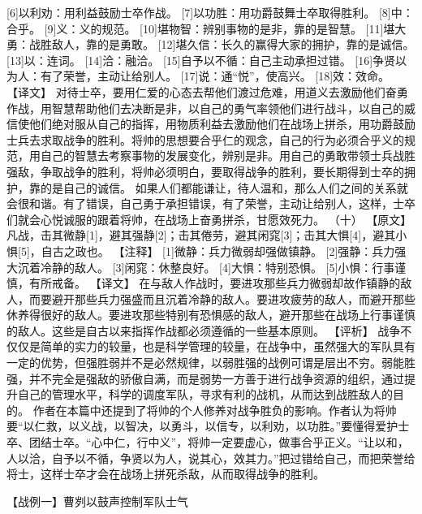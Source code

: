 \documentclass[a4paper,12pt,UTF8,twoside]{ctexbook}
\begin{document}
[6]以利劝：用利益鼓励士卒作战。
[7]以功胜：用功爵鼓舞士卒取得胜利。
[8]中：合乎。
[9]义：义的规范。
[10]堪物智：辨别事物的是非，靠的是智慧。
[11]堪大勇：战胜敌人，靠的是勇敢。
[12]堪久信：长久的赢得大家的拥护，靠的是诚信。
[13]以：连词。
[14]洽：融洽。
[15]自予以不循：自己主动承担过错。
[16]争贤以为人：有了荣誉，主动让给别人。
[17]说：通“悦”，使高兴。
[18]效：效命。
【译文】
对待士卒，要用仁爱的心态去帮他们渡过危难，用道义去激励他们奋勇作战，用智慧帮助他们去决断是非，以自己的勇气率领他们进行战斗，以自己的威信使他们绝对服从自己的指挥，用物质利益去激励他们在战场上拼杀，用功爵鼓励士兵去求取战争的胜利。将帅的思想要合乎仁的观念，自己的行为必须合乎义的规范，用自己的智慧去考察事物的发展变化，辨别是非。用自己的勇敢带领士兵战胜强敌，争取战争的胜利，将帅必须明白，要取得战争的胜利，要长期得到士卒的拥护，靠的是自己的诚信。
如果人们都能谦让，待人温和，那么人们之间的关系就会很和谐。有了错误，自己勇于承担错误，有了荣誉，主动让给别人，这样，士卒们就会心悦诚服的跟着将帅，在战场上奋勇拼杀，甘愿效死力。
（十）
【原文】
凡战，击其微静[1]，避其强静[2]；击其倦劳，避其闲窕[3]；击其大惧[4]，避其小惧[5]，自古之政也。
【注释】
[1]微静：兵力微弱却强做镇静。
[2]强静：兵力强大沉着冷静的敌人。
[3]闲窕：休整良好。
[4]大惧：特别恐惧。
[5]小惧：行事谨慎，有所戒备。
【译文】
在与敌人作战时，要进攻那些兵力微弱却故作镇静的敌人，而要避开那些兵力强盛而且沉着冷静的敌人。要进攻疲劳的敌人，而避开那些休养得很好的敌人。要进攻那些特别有恐惧感的敌人，避开那些在战场上行事谨慎的敌人。这些是自古以来指挥作战都必须遵循的一些基本原则。
【评析】
战争不仅仅是简单的实力的较量，也是科学管理的较量，在战争中，虽然强大的军队具有一定的优势，但强胜弱并不是必然规律，以弱胜强的战例可谓是层出不穷。弱能胜强，并不完全是强敌的骄傲自满，而是弱势一方善于进行战争资源的组织，通过提升自己的管理水平，科学的调度军队，寻求有利的战机，从而达到战胜敌人的目的。
作者在本篇中还提到了将帅的个人修养对战争胜负的影响。作者认为将帅要“以仁救，以义战，以智决，以勇斗，以信专，以利劝，以功胜。”要懂得爱护士卒、团结士卒。“心中仁，行中义”，将帅一定要虚心，做事合乎正义。“让以和，人以洽，自予以不循，争贤以为人，说其心，效其力。”把过错给自己，而把荣誉给将士，这样士卒才会在战场上拼死杀敌，从而取得战争的胜利。


【战例一】曹刿以鼓声控制军队士气
\end{document}
